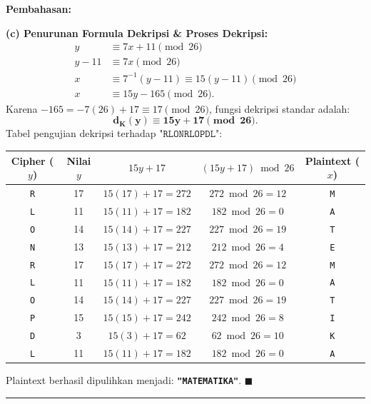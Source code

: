 \documentclass[11pt,a4paper]{article}
\newenvironment{solusi}{\noindent\textbf{\textsf{Pembahasan:}}\par\vspace{0.2em}}{\hfill$\blacksquare$\vspace{1em}\par\hrule\vspace{1em}}
\begin{document}
\begin{solusi}
\vspace{0.2cm}
\textbf{(c) Penurunan Formula Dekripsi \& Proses Dekripsi:}
\begin{align*}
y &\equiv 7x + 11 \pmod{26} \\
y - 11 &\equiv 7x \pmod{26} \\
x &\equiv 7^{-1}(y - 11) \equiv 15(y - 11) \pmod{26} \\
x &\equiv 15y - 165 \pmod{26}.
\end{align*}
Karena $-165 = -7(26) + 17 \equiv 17 \pmod{26}$, fungsi dekripsi standar adalah:
\[
\mathbf{d_K(y) \equiv 15y + 17 \pmod{26}}.
\]
Tabel pengujian dekripsi terhadap $\texttt{"RLONRLOPDL"}$:
\begin{center}
\begin{tabular}{c c c c c}
\toprule
\textbf{Cipher ($y$)} & \textbf{Nilai $y$} & $15y + 17$ & $(15y + 17) \bmod 26$ & \textbf{Plaintext ($x$)} \\
\midrule
\texttt{R} & 17 & $15(17) + 17 = 272$ & $272 \bmod 26 = 12$ & \texttt{M} \\
\texttt{L} & 11 & $15(11) + 17 = 182$ & $182 \bmod 26 = 0$  & \texttt{A} \\
\texttt{O} & 14 & $15(14) + 17 = 227$ & $227 \bmod 26 = 19$ & \texttt{T} \\
\texttt{N} & 13 & $15(13) + 17 = 212$ & $212 \bmod 26 = 4$  & \texttt{E} \\
\texttt{R} & 17 & $15(17) + 17 = 272$ & $272 \bmod 26 = 12$ & \texttt{M} \\
\texttt{L} & 11 & $15(11) + 17 = 182$ & $182 \bmod 26 = 0$  & \texttt{A} \\
\texttt{O} & 14 & $15(14) + 17 = 227$ & $227 \bmod 26 = 19$ & \texttt{T} \\
\texttt{P} & 15 & $15(15) + 17 = 242$ & $242 \bmod 26 = 8$  & \texttt{I} \\
\texttt{D} & 3  & $15(3) + 17 = 62$   & $62 \bmod 26 = 10$  & \texttt{K} \\
\texttt{L} & 11 & $15(11) + 17 = 182$ & $182 \bmod 26 = 0$  & \texttt{A} \\
\bottomrule
\end{tabular}
\end{center}
Plaintext berhasil dipulihkan menjadi: \textbf{\texttt{"MATEMATIKA"}}.
\end{solusi}

\end{document}
